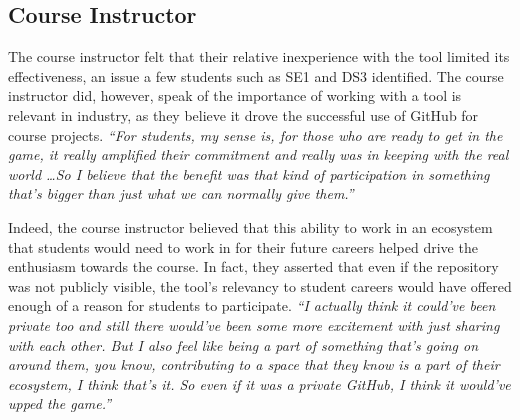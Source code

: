 \subsection{Course Instructor}
The course instructor felt that their relative inexperience with the tool limited its effectiveness, an issue a few students such as SE1 and DS3 identified. The course instructor did, however, speak of the importance of working with a tool is relevant in industry, as they believe it drove the successful use of GitHub for course projects. \textit{``For students, my sense is, for those who are ready to get in the game, it really amplified their commitment and really was in keeping with the real world \ldots So I believe that the benefit was that kind of participation in something that's bigger than just what we can normally give them.''}


Indeed, the course instructor believed that this ability to work in an ecosystem that students would need to work in for their future careers helped drive the enthusiasm towards the course. In fact, they asserted that even if the repository was not publicly visible, the tool's relevancy to student careers would have offered enough of a reason for students to participate. \textit{``I actually think it could've been private too and still there would've been some more excitement with just sharing with each other. But I also feel like being a part of something that's going on around them, you know, contributing to a space that they know is a part of their ecosystem, I think that's it. So even if it was a private GitHub, I think it would've upped the game.''}



